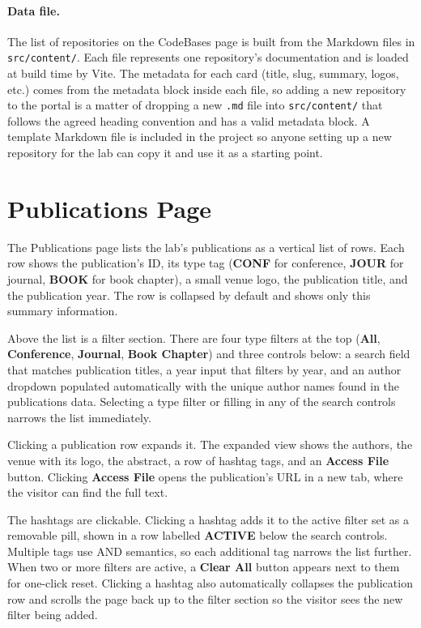 \paragraph{Data file.} The list of repositories on the CodeBases page is built from the Markdown files in \texttt{src/content/}. Each file represents one repository's documentation and is loaded at build time by Vite. The metadata for each card (title, slug, summary, logos, etc.) comes from the metadata block inside each file, so adding a new repository to the portal is a matter of dropping a new \texttt{.md} file into \texttt{src/content/} that follows the agreed heading convention and has a valid metadata block. A template Markdown file is included in the project so anyone setting up a new repository for the lab can copy it and use it as a starting point.

\section{Publications Page}\label{sec:user-publications}

The Publications page lists the lab's publications as a vertical list of rows. Each row shows the publication's ID, its type tag (\textbf{CONF} for conference, \textbf{JOUR} for journal, \textbf{BOOK} for book chapter), a small venue logo, the publication title, and the publication year. The row is collapsed by default and shows only this summary information.

Above the list is a filter section. There are four type filters at the top (\textbf{All}, \textbf{Conference}, \textbf{Journal}, \textbf{Book Chapter}) and three controls below: a search field that matches publication titles, a year input that filters by year, and an author dropdown populated automatically with the unique author names found in the publications data. Selecting a type filter or filling in any of the search controls narrows the list immediately.

Clicking a publication row expands it. The expanded view shows the authors, the venue with its logo, the abstract, a row of hashtag tags, and an \textbf{Access File} button. Clicking \textbf{Access File} opens the publication's URL in a new tab, where the visitor can find the full text.

The hashtags are clickable. Clicking a hashtag adds it to the active filter set as a removable pill, shown in a row labelled \textbf{ACTIVE} below the search controls. Multiple tags use AND semantics, so each additional tag narrows the list further. When two or more filters are active, a \textbf{Clear All} button appears next to them for one-click reset. Clicking a hashtag also automatically collapses the publication row and scrolls the page back up to the filter section so the visitor sees the new filter being added.

